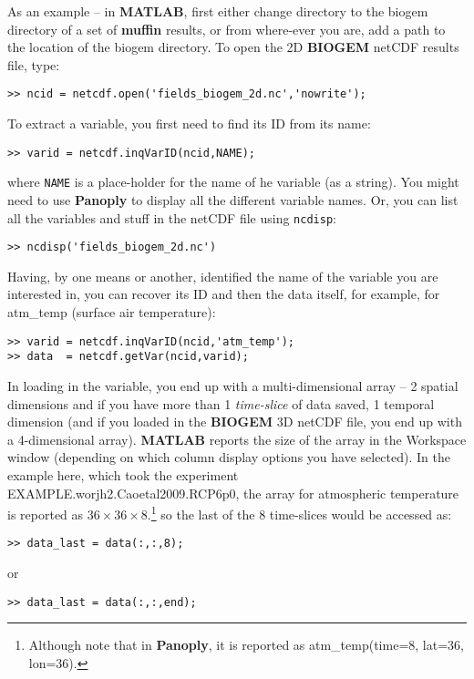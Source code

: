 \documentclass[11pt,fleqn]{book} %
\begin{document}
As an example -- in \textbf{MATLAB}, first either change directory to the \textsf{\small biogem} directory of a set of \textbf{muffin} results, or from where-ever you are, add a path to the location of the \textsf{\small biogem} directory. To open the 2D \textbf{BIOGEM} netCDF results file, type:
\begin{verbatim}
>> ncid = netcdf.open('fields_biogem_2d.nc','nowrite');
\end{verbatim}

To extract a variable, you first need to find its ID from its name:
\begin{verbatim}
>> varid = netcdf.inqVarID(ncid,NAME);
\end{verbatim}
where \texttt{NAME} is a place-holder for the name of he variable (as a string). You might need to use \textbf{Panoply} to display all the different variable names. Or, you can list all the variables and stuff in the netCDF file using \texttt{ncdisp}:
\begin{verbatim}
>> ncdisp('fields_biogem_2d.nc')
\end{verbatim}

Having, by one means or another, identified the name of the variable you are interested in, you can recover its ID and then the data itself, for example, for \textsf{\footnotesize atm\_temp} (\textsf{\footnotesize surface air temperature}):
\begin{verbatim}
>> varid = netcdf.inqVarID(ncid,'atm_temp');
>> data  = netcdf.getVar(ncid,varid);
\end{verbatim}

In loading in the variable, you end up with a multi-dimensional array -- 2 spatial dimensions and if you have more than 1 \textit{time-slice} of data saved, 1 temporal dimension (and if you loaded in the \textbf{BIOGEM} 3D netCDF file, you end up with a 4-dimensional array). \textbf{MATLAB} reports the size of the array in the \textsf{\footnotesize Workspace window} (depending on which column display options you have selected). In the example here, which took the experiment \textsf{\footnotesize EXAMPLE.worjh2.Caoetal2009.RCP6p0}, the array for atmospheric temperature is reported as \(36\times36\times8\).\footnote{Although note that in \textbf{Panoply}, it is reported as \textsf{\scriptsize atm\_temp(time=8, lat=36, lon=36)}.} so the last of the 8 time-slices would  be accessed as:
\begin{verbatim}
>> data_last = data(:,:,8);
\end{verbatim}
or
\begin{verbatim}
>> data_last = data(:,:,end);
\end{verbatim}
\end{document}
